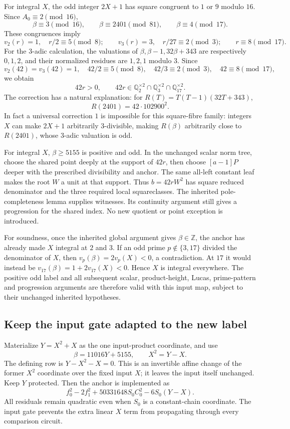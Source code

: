 For integral $X$, the odd integer $2X+1$ has square congruent to $1$ or $9$
modulo $16$. Since $A_0\equiv2\pmod{16}$,
\[
 \beta\equiv3\pmod{16},\qquad
 \beta\equiv2401\pmod{81},\qquad
 \beta\equiv4\pmod{17}.
\]
These congruences imply
\[
 v_2(r)=1,\quad r/2\equiv5\pmod8;
 \qquad
 v_3(r)=3,\quad r/27\equiv2\pmod3;
 \qquad r\equiv8\pmod{17}.
\]
For the $3$-adic calculation, the valuations of
$\beta,\beta-1,32\beta+343$ are respectively $0,1,2$, and their normalized
residues are $1,2,1$ modulo $3$.
Since
\[
 v_2(42)=v_3(42)=1,\quad42/2\equiv5\pmod8,
 \quad42/3\equiv2\pmod3,\quad42\equiv8\pmod{17},
\]
we obtain
\[
 42r>0,\qquad
 42r\in\mathbb Q_2^{\times2}\cap\mathbb Q_3^{\times2}
                 \cap\mathbb Q_{17}^{\times2}.
\]
The correction has a natural explanation: for $R(T)=T(T-1)(32T+343)$,
\[
 R(2401)=42\cdot102900^2.
\]
In fact a universal correction $1$ is impossible for this square-fibre
family: integers $X$ can make $2X+1$ arbitrarily $3$-divisible, making
$R(\beta)$ arbitrarily close to $R(2401)$, whose $3$-adic valuation is odd.

For integral $X$, $\beta\ge5155$ is positive and odd. In the unchanged
scalar norm tree, choose the shared point deeply at the support of $42r$,
then choose $[a-1]P$ deeper with the prescribed divisibility and anchor.
The same all-left constant leaf makes the root $W$ a unit at that support.
Thus $b=42rW^2$ has square reduced denominator and the three required local
squareclasses. The inherited pole-completeness lemma supplies witnesses.
Its continuity argument still gives a progression for the shared index.
No new quotient or point exception is introduced.

For soundness, once the inherited global argument gives $\beta\in\mathbb Z$,
the anchor has already made $X$ integral at $2$ and $3$. If an odd prime
$p\notin\{3,17\}$ divided the denominator of $X$, then
$v_p(\beta)=2v_p(X)<0$, a contradiction. At $17$ it would instead be
$v_{17}(\beta)=1+2v_{17}(X)<0$. Hence $X$ is integral everywhere.
The positive odd label and all subsequent scalar, product-height, Lucas,
prime-pattern and progression arguments are therefore valid with this
input map, subject to their unchanged inherited hypotheses.

\subsection{Keep the input gate adapted to the new label}

Materialize $Y=X^2+X$ as the one input-product coordinate, and use
\[
 \beta=11016Y+5155,\qquad X^2=Y-X.
\]
The defining row is $Y-X^2-X=0$. This is an invertible affine change of
the former $X^2$ coordinate over the fixed input $X$; it leaves the input
itself unchanged. Keep $Y$ protected. Then the anchor is implemented as
\[
 f_0^2-2f_1^2+50331648S_0C_0^2-6S_0(Y-X).
\]
All residuals remain quadratic even when $S_0$ is a constant-chain
coordinate. The input gate prevents the extra linear $X$ term from
propagating through every comparison circuit.

